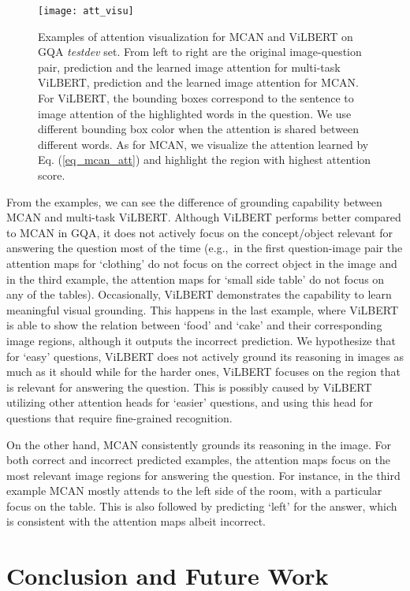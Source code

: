\documentclass{article}
\begin{document}
\begin{figure}[!ht]
	\centering
	\texttt{[image: att\_visu]}
	\caption{Examples of attention visualization for MCAN and ViLBERT on GQA \textit{testdev} set. From left to right are the original image-question pair, prediction and the learned image attention for multi-task ViLBERT, prediction and the learned image attention for MCAN. For ViLBERT, the bounding boxes correspond to the sentence to image attention of the highlighted words in the question. We use different bounding box color when the attention is shared between different words. As for MCAN, we visualize the attention learned by Eq. (\ref{eq_mcan_att}) and highlight the region with highest attention score.}
	\label{fig:att_visu}
\end{figure}

From the examples, we can see the difference of grounding capability between MCAN and multi-task ViLBERT. Although ViLBERT performs better compared to MCAN in GQA, it does not actively focus on the concept/object relevant for answering the question most of the time (e.g.,\ in the first question-image pair the attention maps for `clothing' do not focus on the correct object in the image and in the third example, the attention maps for `small side table' do not focus on any of the tables). Occasionally, ViLBERT demonstrates the capability to learn meaningful visual grounding. This happens in the last example, where ViLBERT is able to show the relation between `food' and `cake' and their corresponding image regions, although it outputs the incorrect prediction. We hypothesize that for `easy' questions, ViLBERT does not actively ground its reasoning in images as much as it should while for the harder ones, ViLBERT focuses on the region that is relevant for answering the question. This is possibly caused by ViLBERT utilizing other attention heads for `easier' questions, and using this head for questions that require fine-grained recognition.

On the other hand, MCAN consistently grounds its reasoning in the image. For both correct and incorrect predicted examples, the attention maps focus on the most relevant image regions for answering the question. For instance, in the third example MCAN mostly attends to the left side of the room, with a particular focus on the table. This is also followed by predicting `left' for the answer, which is consistent with the attention maps albeit incorrect.

\section{Conclusion and Future Work}
\end{document}
